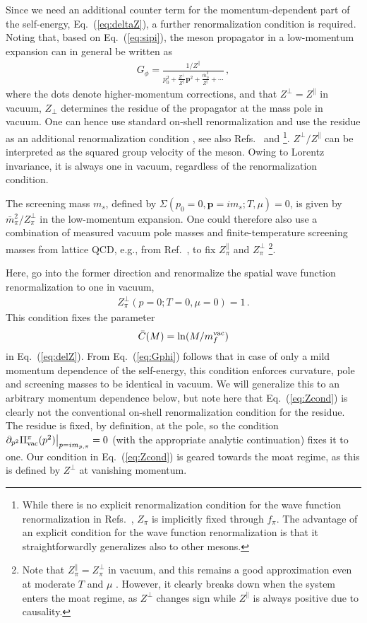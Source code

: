 \documentclass[reprint,english,superscriptaddress,preprintnumbers,amsmath,amssymb,aps,prd]{revtex4-2}
\def\Eq#1{Eq.~(\ref{#1})}
\begin{document}
Since we need an additional counter term for the momentum-dependent part of the self-energy,  \Eq{eq:deltaZ}, a further renormalization condition is required. Noting that, based on \Eq{eq:sipi}, the meson propagator in a low-momentum expansion can in general be written as
\begin{align}\label{eq:Gphi}
    G_\phi = \frac{1/Z^\parallel}{p_0^2+\frac{Z^\perp}{Z^\parallel}\boldsymbol{p}^2 + \frac{\bar m^2_\phi}{Z^\parallel} + \cdots}\,,
\end{align}
where the dots denote higher-momentum corrections, and that $Z^\perp = Z^\parallel$ in vacuum, $Z_\perp$ determines the residue of the propagator at the mass pole in vacuum. One can hence use standard on-shell renormalization and use the residue as an additional renormalization condition \cite{Peskin:1995ev}, see also Refs.\ \cite{Adhikari:2016eef, Brandt:2025tkg} and \footnote{While there is no explicit renormalization condition for the wave function renormalization in Refs.\ \cite{Carignano:2014jla, Carignano:2016jnw, Buballa:2020xaa}, $Z_\pi$ is implicitly fixed through $f_\pi$. The advantage of an explicit condition for the wave function renormalization is that it straightforwardly generalizes also to other mesons.}. $Z^\perp/Z^\parallel$ can be interpreted as the squared group velocity of the meson. Owing to Lorentz invariance, it is always one in vacuum, regardless of the renormalization condition.

The screening mass $m_s$, defined by $\Sigma(p_0=0, \boldsymbol{p} = im_s;T,\mu) = 0$, is given by $\bar m_\pi^2/Z_\pi^\perp$ in the low-momentum expansion. One could therefore also use a combination of measured vacuum pole masses and finite-temperature screening masses from lattice QCD, e.g., from Ref.\ \cite{Bazavov:2019www}, to fix $Z_\pi^\parallel$ and $Z_\pi^\perp$ \footnote{Note that $Z_\pi^\parallel = Z_\pi^\perp$ in vacuum, and this remains a good approximation even at moderate $T$ and $\mu$ \cite{Yin:2019ebz}. However, it clearly breaks down when the system enters the moat regime, as $Z^\perp$ changes sign while $Z^\parallel$ is always positive due to causality.}.

Here, go into the former direction and renormalize the spatial wave function renormalization to one in vacuum,
\begin{align}\label{eq:Zcond}
    Z_\pi^\perp(p=0;T=0,\mu=0) = 1\,.
\end{align}
This condition fixes the parameter
\begin{align}
    \bar C(M) = \ln(M/m_f^{\rm vac})
\end{align}
in \Eq{eq:delZ}. From \Eq{eq:Gphi} follows that in case of only a mild momentum dependence of the self-energy, this condition enforces curvature, pole and screening masses to be identical in vacuum. We will generalize this to an arbitrary momentum dependence below, but note here that \Eq{eq:Zcond} is clearly not the conventional on-shell renormalization condition for the residue. The residue is fixed, by definition, at the pole, so the condition $\partial_{p^2} \Pi^\pi_{\rm vac}(p^2)\big|_{p = i m_{p,\pi}} = 0$ (with the appropriate analytic continuation) fixes it to one. Our condition in \Eq{eq:Zcond} is geared towards the moat regime, as this is defined by $Z^\perp$ at vanishing momentum.
\end{document}
